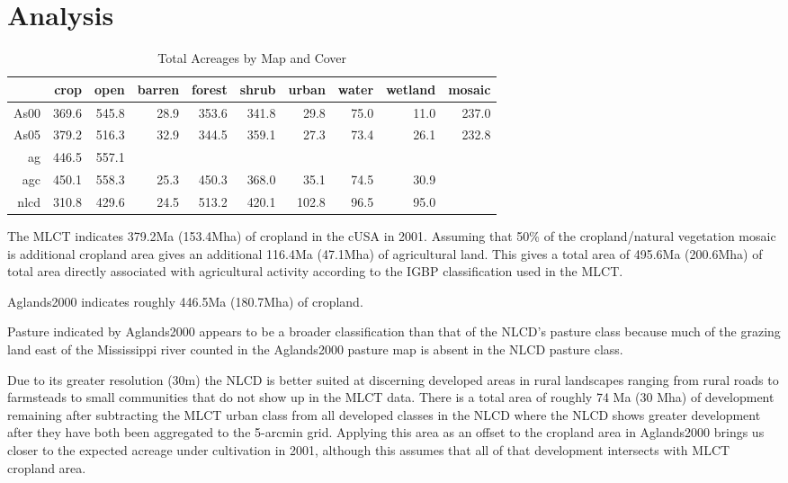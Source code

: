 


\graphicspath{ {analysis/} }

\chapter{Analysis}
\label{cha:analysis}


\begin{table}[ht]
\begin{center}
\begin{tabular}{rrrrrrrrrr}
  \hline
 & crop & open & barren & forest & shrub & urban & water & wetland & mosaic \\ 
  \hline
As00 & 369.6 & 545.8 & 28.9 & 353.6 & 341.8 & 29.8 & 75.0 & 11.0 & 237.0 \\ 
  As05 & 379.2 & 516.3 & 32.9 & 344.5 & 359.1 & 27.3 & 73.4 & 26.1 & 232.8 \\ 
  ag & 446.5 & 557.1 &  &  &  &  &  &  &  \\ 
  agc & 450.1 & 558.3 & 25.3 & 450.3 & 368.0 & 35.1 & 74.5 & 30.9 &  \\ 
  nlcd & 310.8 & 429.6 & 24.5 & 513.2 & 420.1 & 102.8 & 96.5 & 95.0 &  \\ 
   \hline
\end{tabular}
\caption{Total Acreages by Map and Cover}
\label{tab:total}
\end{center}
\end{table}
The MLCT indicates 379.2Ma (153.4Mha) of
cropland in the cUSA in 2001. Assuming that 50\% of the
cropland/natural vegetation mosaic is additional cropland area gives
an additional 116.4Ma (47.1Mha)
of agricultural land. This gives a total area of 
495.6Ma (200.6Mha)
of total area directly associated with
agricultural activity according to the IGBP classification used in the
MLCT.

Aglands2000 indicates roughly 446.5Ma (180.7Mha) 
of cropland.

Pasture indicated by Aglands2000 appears to be a broader
classification than that of the NLCD's pasture class because much of
the grazing land east of the Mississippi river counted in the
Aglands2000 pasture map is absent in the NLCD pasture class.

Due to its greater resolution (30m) the NLCD is better suited at
discerning developed areas in rural landscapes ranging from rural
roads to farmsteads to small communities that do not show up in the
MLCT data. There is a total area of roughly 74 Ma (30 Mha) of
development remaining after subtracting the MLCT urban class from all
developed classes in the NLCD where the NLCD shows greater development
after they have both been aggregated to the 5-arcmin grid. Applying
this area as an offset to the cropland area in Aglands2000 brings us
closer to the expected acreage under cultivation in 2001, although
this assumes that all of that development intersects with MLCT
cropland area.


